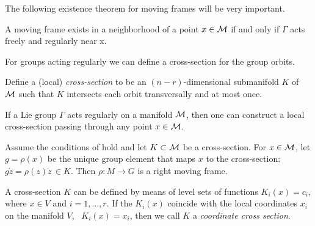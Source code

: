 The following existence theorem for moving frames will be very important.

\begin{theorem}
 A moving frame exists in a neighborhood of a point $x\in \mathcal{M}$ if and
 only if $\Gamma$ acts freely and regularly near x.
\end{theorem}


For groups acting regularly we can define a cross-section for the group orbits.

\begin{definition}
\label{def:cross-section}
Define a (local) \emph{cross-section}
to be an $(n-r)$-dimensional submanifold $K$ of $\mathcal{M}$ such that $K$ intersects each orbit transversally and at most once.
\end{definition}


\begin{proposition}%
 \label{pro:crossExist}
 If a Lie group $\Gamma$ acts regularly on a manifold $\mathcal{M}$, then one can construct a local cross-section
 passing through any point $x\in \mathcal{M}$.
\end{proposition}

\begin{theorem} 
 Assume the conditions of  hold and let $K\subset\mathcal{M}$ be a cross-section. 
 For $x\in \mathcal{M}$, let $g=ρ(x)$ be the unique group element that maps $x$ to the
 cross-section: $g\dot z = ρ(z) \dot z\, \in K$. Then $ρ:M\rightarrow G$ is a right moving frame.
\end{theorem}

A cross-section $K$ can be defined by means of level sets of functions $K_i(x)=c_i$,
where $x\in V$ and $i=1,\ldots,r$. If the $K_i(x)$
coincide with the local coordinates $x_i$ on the manifold $V$, \ie~$K_i(x)=x_i$,
then we call $K$ a \emph{coordinate cross
section}. 

